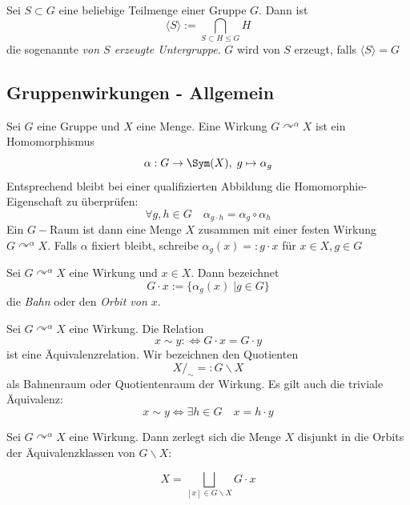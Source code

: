 \documentclass[11pt, a4paper]{article}
\begin{document}
\begin{definition}
Sei $S\subset G$ eine beliebige Teilmenge einer Gruppe $G$. Dann ist 
$$\langle S \rangle := \bigcap _{S\subset H\leqslant G} H$$
die sogenannte \emph{von $S$ erzeugte Untergruppe}. $G$ wird von $S$ erzeugt, falls $\langle S\rangle = G$
\end{definition}

\subsection{Gruppenwirkungen - Allgemein}
\begin{definition}
Sei $G$ eine Gruppe und $X$ eine Menge.
Eine Wirkung $G \curvearrowright^\alpha X$ ist ein Homomorphismus $$\alpha: G \to \Sym (X), \; g\mapsto \alpha_g$$
Entsprechend bleibt bei einer qualifizierten Abbildung die Homomorphie-Eigenschaft zu überprüfen:
$$\forall g,h \in G \quad \alpha_{g\cdot h} = \alpha_g \circ \alpha_h$$
Ein $G-$Raum ist dann eine Menge $X$ zusammen mit einer festen Wirkung $G\curvearrowright ^\alpha X$. Falls $\alpha$ fixiert bleibt, schreibe $\alpha_g(x)=: g\cdot x$ für $x\in X, g\in G$
\end{definition}

\begin{definition} 
    Sei $G \curvearrowright^\alpha X$ eine Wirkung und $x\in X$. Dann bezeichnet
    $$G\cdot x := \{\alpha_g(x) \;| g\in G\}$$
    die \emph{Bahn} oder den \emph{Orbit von $x$}.
\end{definition}

\begin{corollary}
    Sei $G \curvearrowright^\alpha X$ eine Wirkung. Die Relation $$x\sim y :\Longleftrightarrow G\cdot x = G\cdot y$$ ist eine Äquivalenzrelation. Wir bezeichnen den Quotienten 
    $$X/_\sim =: G\backslash X$$
    als Bahnenraum oder Quotientenraum der Wirkung. Es gilt auch die triviale Äquivalenz:
    $$x\sim y \Longleftrightarrow \exists h \in G \quad x = h\cdot y$$
\end{corollary}

\begin{lemma} 
Sei $G \curvearrowright^\alpha X$ eine Wirkung. Dann zerlegt sich die Menge $X$ disjunkt in die Orbits der Äquivalenzklassen von $G\backslash X$:

$$X = \bigsqcup _ {[x]\in G\backslash X} G\cdot x$$
    
\end{lemma}
\end{document}

